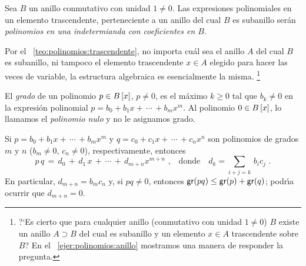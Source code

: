 \begin{defPolinomios}\label{def:polinomios:indeterminada}
	Sea $B$ un anillo conmutativo con unidad $1\neq 0$. Las
	expresiones polinomiales en un elemento trascendente,
	perteneciente a un anillo del cual $B$ es subanillo ser\'an
	\emph{polinomios en una indetermianda con coeficientes en $B$}.
\end{defPolinomios}

\begin{obsPolinomios}\label{obs:polinomios:indeterminada}
	Por el \teoname~\ref{teo:polinomios:trascendente}, no importa
	cu\'al sea el anillo $A$ del cual $B$ es subanillo, ni tampoco el
	elemento trascendente $x\in A$ elegido para hacer las veces de
	variable, la estructura algebraica es esencialmente la misma.%
	\footnote{
		?`Es cierto que para cualquier anillo (conmutativo con
		unidad $1\neq 0$) $B$ existe un anillo $A\supset B$ del
		cual es subanillo y un elemento $x\in A$ trascendente
		sobre $B$?
		En el \ejername~\ref{ejer:polinomios:anillo} mostramos
		una manera de responder la pregunta.
	}
\end{obsPolinomios}

\begin{defPolinomios}\label{def:polinomios:grado}
	El \emph{grado} de un polinomio $p\in\polinomios[x] B$, $p\neq 0$,
	es el m\'aximo $k\geq 0$ tal que $b_k\neq 0$ en la expresi\'on
	polinomial $p=b_0+b_1x+\,\cdots\,+b_mx^m$.
	Al polinomio $0\in\polinomios[x] B$, lo llamamos el
	\emph{polinomio nulo} y no le asignamos grado.
\end{defPolinomios}

Si $p=b_0+b_1x+\,\cdots\,+b_mx^m$ y $q=c_0+c_1x+\,\cdots\,+c_nx^n$ son
polinomios de grados $m$ y $n$ ($b_m\neq 0$, $c_n\neq 0$), respectivamente,
entonces
\begin{displaymath}
	p\,q\,=\,d_0\,+\,d_1\,x\,+\,\cdots\,+\,d_{m+n}x^{m+n}
		\text{ ,}\quad\text{donde}\quad
		d_k=\sum_{i+j=k}\,b_ic_j
	\text{ .}
\end{displaymath}
%
En particular, $d_{m+n}=b_mc_n$ y, si $pq\neq 0$, entonces
$\grado(pq)\leq\grado(p)+\grado(q)$; podr\'{\i}a ocurrir que $d_{m+n}=0$.

